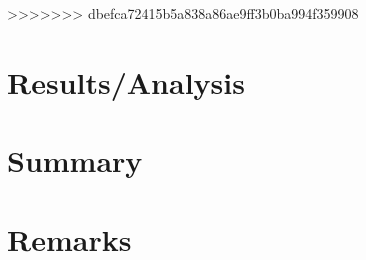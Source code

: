 \documentclass[12pt,titlepage,final]{article}
\begin{document}
>>>>>>> dbefca72415b5a838a86ae9ff3b0ba994f359908
\section{Results/Analysis}

\section{Summary}

\section{Remarks}

  
\end{document}
